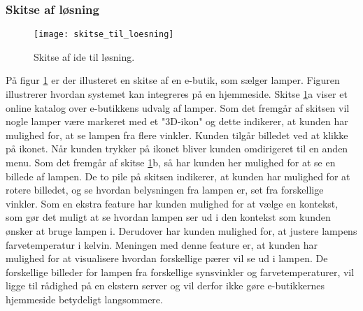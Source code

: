 \subsubsection{Skitse af løsning}

\label{sec:skitse_loesning}

\begin{figure}[H]
   \centering
   \texttt{[image: skitse\_til\_loesning]}
   \caption{Skitse af ide til løsning.}
   \label{fig:skitse_af_ide}
\end{figure}

På figur \ref{fig:skitse_af_ide} er der illusteret en skitse af en e-butik, som sælger lamper. Figuren illustrerer hvordan systemet kan integreres på en hjemmeside. Skitse \ref{fig:skitse_af_ide}a viser et online katalog over e-butikkens udvalg af lamper. Som det fremgår af skitsen vil nogle lamper være markeret med et "3D-ikon" og dette indikerer, at kunden har mulighed for, at se lampen fra flere vinkler. Kunden tilgår billedet ved at klikke på ikonet. Når kunden trykker på ikonet bliver kunden omdirigeret til en anden menu. Som det fremgår af skitse \ref{fig:skitse_af_ide}b, så har kunden her mulighed for at se en billede af lampen. De to pile på skitsen indikerer, at kunden har mulighed for at rotere billedet, og se hvordan belysningen fra lampen er, set fra forskellige vinkler. Som en ekstra feature har kunden mulighed for at vælge en kontekst, som gør det muligt at se hvordan lampen ser ud i den kontekst som kunden ønsker at bruge lampen i. 
Derudover har kunden mulighed for, at justere lampens farvetemperatur i kelvin. Meningen med denne feature er, at kunden har mulighed for at visualisere hvordan forskellige pærer vil se ud i lampen. De forskellige billeder for lampen fra forskellige synsvinkler og farvetemperaturer, vil ligge til rådighed på en ekstern server og vil derfor ikke gøre e-butikkernes hjemmeside betydeligt langsommere. 

